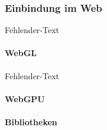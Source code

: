 \subsubsection{Einbindung im Web}
Fehlender-Text

\paragraph{WebGL}
Fehlender-Text

\paragraph{WebGPU}

\paragraph{Bibliotheken}
